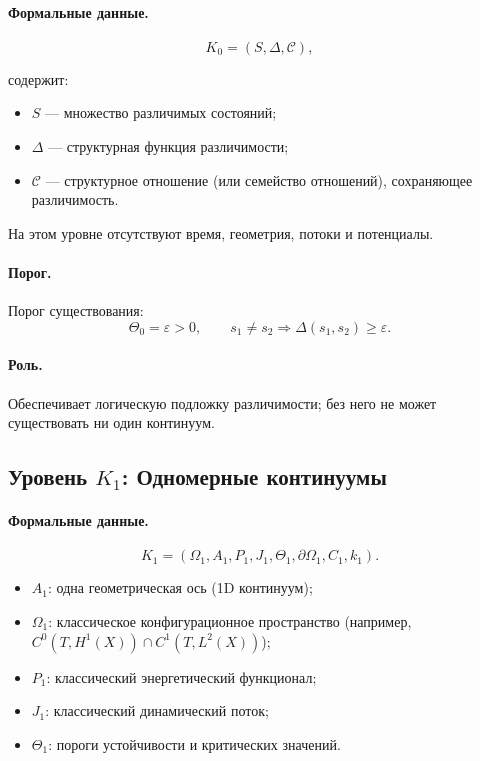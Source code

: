 \paragraph{Формальные данные.}
\[
    K_0 = (S,\Delta,\mathcal{C}),
\]

содержит:
\begin{itemize}
    \item \(S\) — множество различимых состояний;
    \item \(\Delta\) — структурная функция различимости;
    \item \(\mathcal{C}\) — структурное отношение (или семейство отношений),
          сохраняющее различимость.
\end{itemize}

На этом уровне отсутствуют время, геометрия, потоки и потенциалы.

\paragraph{Порог.}
Порог существования:
\[
   \Theta_0 = \varepsilon > 0,
   \qquad
   s_1 \neq s_2 \Rightarrow \Delta(s_1,s_2) \ge \varepsilon.
\]

\paragraph{Роль.}
Обеспечивает логическую подложку различимости;
без него не может существовать ни один континуум.


\subsection{Уровень \texorpdfstring{\texorpdfstring{$K_1$}{K\_1}}{K1}: Одномерные континуумы}

\paragraph{Формальные данные.}
\[
    K_1 = (\Omega_1, A_1, P_1, J_1, \Theta_1,
           \partial\Omega_1, C_1, k_1).
\]

\begin{itemize}
    \item \(A_1\): одна геометрическая ось (1D континуум);
    \item \(\Omega_1\): классическое конфигурационное пространство
          (например, \(C^0(T,H^1(X))\cap C^1(T,L^2(X))\));
    \item \(P_1\): классический энергетический функционал;
    \item \(J_1\): классический динамический поток;
    \item \(\Theta_1\): пороги устойчивости и критических значений.
\end{itemize}


